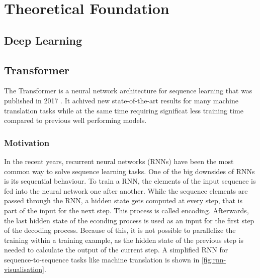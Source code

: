 \chapter{Theoretical Foundation }\label{ch:theoretical-foundation}

\Blindtext


\section{Deep Learning}

\Blindtext


\section{Transformer}

The Transformer is a neural network architecture for sequence learning that was published in 2017 \cite{1706.03762}.
It achived new state-of-the-art results for many machine translation tasks while at the same time requiring significat less training time compared to previous well performing models.

\subsection{Motivation}

In the recent years, recurrent neural networks (RNNs) have been the most common way to solve sequence learning tasks.
One of the big downsides of RNNs is its sequential behaviour.
To train a RNN, the elements of the input sequence is fed into the neural network one after another.
While the sequence elements are passed through the RNN, a hidden state gets computed at every step, that is part of the input for the next step.
This process is called encoding.
Afterwards, the last hidden state of the econding process is used as an input for the first step of the decoding process.
Because of this, it is not possible to parallelize the training within a training example, as the hidden state of the previous step is needed to calculate the output of the current step. \cite[p.~~2]{1706.03762}
A simplified RNN for sequence-to-sequence tasks like machine translation is shown in \autoref{fig:rnn-visualisation}.

